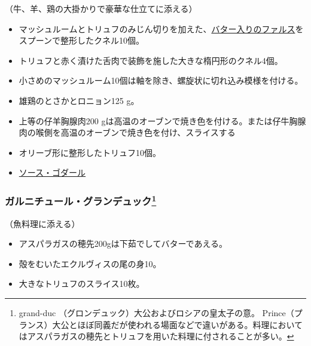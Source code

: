 \begin{recette}


（牛、羊、鶏の大掛かりで豪華な仕立てに添える）

\begin{itemize}
\item
  マッシュルームとトリュフのみじん切りを加えた、\protect\hyperlink{farce-a}{バター入りのファルス}をスプーンで整形したクネル10個。
\item
  トリュフと赤く漬けた舌肉で装飾を施した大きな楕円形のクネル4個。
\item
  小さめのマッシュルーム10個は軸を除き、螺旋状に切れ込み模様を付ける。
\item
  雄鶏のとさかとロニョン125 g。
\item
  上等の仔羊胸腺肉200
  gは高温のオーブンで焼き色を付ける。または仔牛胸腺肉の喉側を高温のオーブンで焼き色を付け、スライスする
\item
  オリーブ形に整形したトリュフ10個。
\item
  \protect\hyperlink{sauce-godard}{ソース・ゴダール}
\end{itemize}

\hypertarget{garniture-grand-duc}{%
\subsubsection[ガルニチュール・グランデュック]{\texorpdfstring{ガルニチュール・グランデュック\footnote{grand-duc
  （グロンデュック）大公およびロシアの皇太子の意。
  Prince（プランス）大公とほぼ同義だが使われる場面などで違いがある。料理においてはアスパラガスの穂先とトリュフを用いた料理に付されることが多い。}}{ガルニチュール・グランデュック}}\label{garniture-grand-duc}}



（魚料理に添える）

\begin{itemize}
\item
  アスパラガスの穂先200gは下茹でしてバターであえる。
\item
  殻をむいたエクルヴィスの尾の身10。
\item
  大きなトリュフのスライス10枚。
\end{itemize}


\end{recette}
